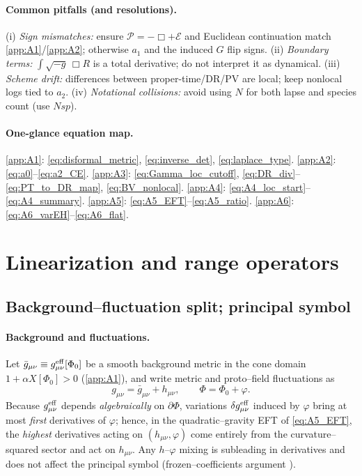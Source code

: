 \documentclass{iopjournal}
\begin{document}
\paragraph{Common pitfalls (and resolutions).}
(i) \emph{Sign mismatches:} ensure $\mathcal{P}=-\Box+\mathcal{E}$ and Euclidean continuation match \cref{app:A1}/\cref{app:A2}; otherwise $a_1$ and the induced $G$ flip signs.
(ii) \emph{Boundary terms:} $\int\!\sqrt{-g}\,\Box R$ is a total derivative; do not interpret it as dynamical.
(iii) \emph{Scheme drift:} differences between proper-time/DR/PV are local; keep nonlocal logs tied to $a_2$.
(iv) \emph{Notational collisions:} avoid using $N$ for both lapse and species count (use $Nsp$).

\paragraph{One-glance equation map.}
\cref{app:A1}: \eqref{eq:disformal_metric}, \eqref{eq:inverse_det}, \eqref{eq:laplace_type}. \quad
\cref{app:A2}: \eqref{eq:a0}–\eqref{eq:a2_CE}. \quad
\cref{app:A3}: \eqref{eq:Gamma_loc_cutoff}, \eqref{eq:DR_div}–\eqref{eq:PT_to_DR_map}, \eqref{eq:BV_nonlocal}. \quad
\cref{app:A4}: \eqref{eq:A4_loc_start}–\eqref{eq:A4_summary}. \quad
\cref{app:A5}: \eqref{eq:A5_EFT}–\eqref{eq:A5_ratio}. \quad
\cref{app:A6}: \eqref{eq:A6_varEH}–\eqref{eq:A6_flat}.


\section{Linearization and range operators}\label{app:B} %
\subsection{Background–fluctuation split; principal symbol}\label{app:B1}

\paragraph{Background and fluctuations.}
Let $\bar g_{\mu\nu}\equiv g^{\rm eff}_{\mu\nu}[\Phi_0]$ be a smooth background metric in the cone domain $1+\alpha X[\Phi_0]>0$ (\cref{app:A1}), and write metric and proto–field fluctuations as
\begin{equation}
g_{\mu\nu}=\bar g_{\mu\nu}+h_{\mu\nu},\qquad
\Phi=\Phi_0+\varphi .
\label{eq:B1_split}
\end{equation}
Because $g^{\rm eff}_{\mu\nu}$ depends \emph{algebraically} on $\partial\Phi$, variations $\delta g^{\rm eff}_{\mu\nu}$ induced by $\varphi$ bring at most \emph{first} derivatives of $\varphi$; hence, in the quadratic–gravity EFT of \eqref{eq:A5_EFT}, the \emph{highest} derivatives acting on $(h_{\mu\nu},\varphi)$ come entirely from the curvature–squared sector and act on $h_{\mu\nu}$. Any $h$–$\varphi$ mixing is subleading in derivatives and does not affect the principal symbol (frozen–coefficients argument \cite{BGV2007,Vassilevich2003}).
\end{document}
